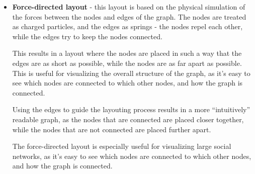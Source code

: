 \begin{itemize}
    \item \textbf{Force-directed layout} - this layout is based on the physical simulation of the forces between the nodes and edges of the graph.
    The nodes are treated as charged particles, and the edges as springs - the nodes repel each other, while the edges try to keep the nodes connected.
    
    This results in a layout where the nodes are placed in such a way that the edges are as short as possible, while the nodes are as far apart as possible.
    This is useful for visualizing the overall structure of the graph, as it's easy to see which nodes are connected to which other nodes, and how the graph is connected.

    Using the edges to guide the layouting process results in a more ``intuitively'' readable graph, as the nodes that are connected are placed closer together, while the nodes that are not connected are placed further apart.

    The force-directed layout is especially useful for visualizing large social networks, as it's easy to see which nodes are connected to which other nodes, and how the graph is connected.
    


\end{itemize}

